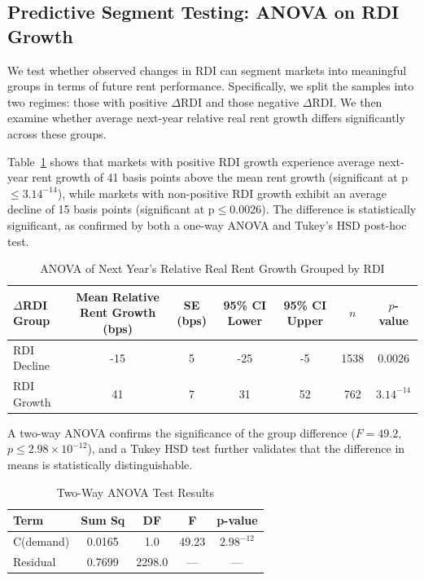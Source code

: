 \documentclass[APA,Times1COL]{WileyNJDv5} %
\begin{document}
\subsection{Predictive Segment Testing: ANOVA on RDI Growth}
We test whether observed changes in RDI can segment markets into meaningful groups in terms of future rent performance. Specifically, we split the samples into two regimes: those with positive $\Delta$RDI and those negative $\Delta$RDI. We then examine whether average next-year relative real rent growth differs significantly across these groups.

Table~\ref{tab:anova-results} shows that markets with positive RDI growth experience average next-year rent growth of 41 basis points above the mean rent growth (significant at p$\leq 3.14^{-14}$), while markets with non-positive RDI growth exhibit an average decline of 15 basis points (significant at p$\leq$0.0026). The difference is statistically significant, as confirmed by both a one-way ANOVA and Tukey’s HSD post-hoc test.

\begin{table}[h]
	\centering
	\caption{ANOVA of Next Year's Relative Real Rent Growth Grouped by RDI}
	\label{tab:anova-results}
	\begin{tabular}{lcccccc} \toprule
		$\Delta$RDI Group & Mean Relative Rent Growth (bps) & SE (bps) & 95\% CI Lower & 95\% CI Upper & $n$ & $p$-value \\ \midrule
		RDI Decline & -15 & 5 & -25 & -5 & 1538 & 0.0026 \\
		RDI Growth & 41 & 7 & 31 & 52 & 762 & $3.14^{-14}$ \\
		\bottomrule
	\end{tabular}
\end{table}

A two-way ANOVA confirms the significance of the group difference ($F = 49.2$, $p \leq 2.98 \times 10^{-12}$), and a Tukey HSD test further validates that the difference in means is statistically distinguishable.
\begin{table}[h]
	\centering
	\caption{Two-Way ANOVA Test Results}
	\label{tab:two-way-anova}
	\begin{tabular}{lcccc} \toprule
		Term & Sum Sq & DF & F & p-value \\ \midrule
		C(demand) & 0.0165 & 1.0 & 49.23 &  $2.98^{-12}$\\
		Residual & 0.7699 & 2298.0 & --- & --- \\
		\bottomrule
	\end{tabular}
\end{table}
\end{document}
